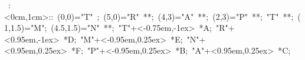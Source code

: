 

\hbox{
\xy    <1cm,0cm>:<0cm,1cm>::
       (0,0)="T" ; (5,0)="R" **\dir{-}; 
       (4,3)="A" **\dir{-};  (2,3)="P" **\dir{-}; "T" **\dir{-};
       (1,1.5)="M"; (4.5,1.5)="N" **\dir{-};
       "T"+<-0.75em,-1ex> *{A};
       "R"+<0.95em,-1ex> *{D};
       "M"+<-0.95em,0.25ex> *{E};
       "N"+<0.95em,0.25ex> *{F};
       "P"+<-0.95em,0.25ex> *{B};
       "A"+<0.95em,0.25ex> *{C};
\endxy}
	   
